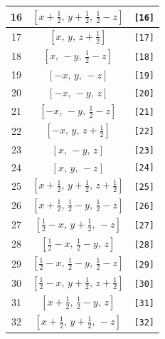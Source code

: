 \documentclass[fleqn,8pt]{jsarticle}
\begin{document}
\begin{longtable}{ccc}
16 & $\left[ x + \frac{1}{2},\, y + \frac{1}{2},\, \frac{1}{2} - z \right]$ & {\tt [16]} \\ \hline
17 & $\left[ x,\, y,\, z + \frac{1}{2} \right]$ & {\tt [17]} \\ \hline
18 & $\left[ x,\, - y,\, \frac{1}{2} - z \right]$ & {\tt [18]} \\ \hline
19 & $\left[ - x,\, y,\, - z \right]$ & {\tt [19]} \\ \hline
20 & $\left[ - x,\, - y,\, z \right]$ & {\tt [20]} \\ \hline
21 & $\left[ - x,\, - y,\, \frac{1}{2} - z \right]$ & {\tt [21]} \\ \hline
22 & $\left[ - x,\, y,\, z + \frac{1}{2} \right]$ & {\tt [22]} \\ \hline
23 & $\left[ x,\, - y,\, z \right]$ & {\tt [23]} \\ \hline
24 & $\left[ x,\, y,\, - z \right]$ & {\tt [24]} \\ \hline
25 & $\left[ x + \frac{1}{2},\, y + \frac{1}{2},\, z + \frac{1}{2} \right]$ & {\tt [25]} \\ \hline
26 & $\left[ x + \frac{1}{2},\, \frac{1}{2} - y,\, \frac{1}{2} - z \right]$ & {\tt [26]} \\ \hline
27 & $\left[ \frac{1}{2} - x,\, y + \frac{1}{2},\, - z \right]$ & {\tt [27]} \\ \hline
28 & $\left[ \frac{1}{2} - x,\, \frac{1}{2} - y,\, z \right]$ & {\tt [28]} \\ \hline
29 & $\left[ \frac{1}{2} - x,\, \frac{1}{2} - y,\, \frac{1}{2} - z \right]$ & {\tt [29]} \\ \hline
30 & $\left[ \frac{1}{2} - x,\, y + \frac{1}{2},\, z + \frac{1}{2} \right]$ & {\tt [30]} \\ \hline
31 & $\left[ x + \frac{1}{2},\, \frac{1}{2} - y,\, z \right]$ & {\tt [31]} \\ \hline
32 & $\left[ x + \frac{1}{2},\, y + \frac{1}{2},\, - z \right]$ & {\tt [32]} \\
\end{longtable}
\end{document}
